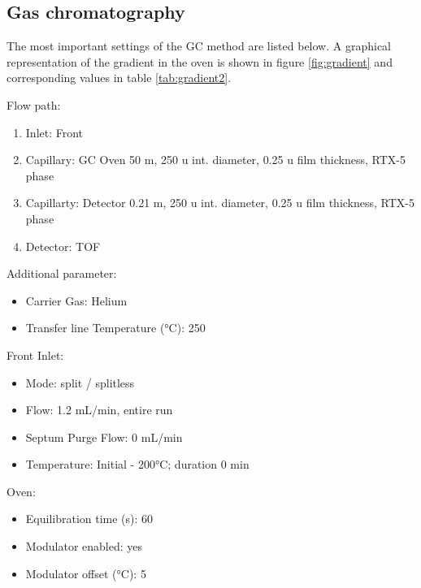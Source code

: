 \documentclass[]{book}
\providecommand{\tightlist}{%
  \setlength{\itemsep}{0pt}\setlength{\parskip}{0pt}}
\theoremstyle{definition}
\theoremstyle{definition}
\theoremstyle{definition}
\theoremstyle{remark}
\begin{document}
\subsection{Gas chromatography}\label{gas-chromatography}

The most important settings of the GC method are listed below. A
graphical representation of the gradient in the oven is shown in figure
\ref{fig:gradient} and corresponding values in table
\ref{tab:gradient2}.

Flow path:

\begin{enumerate}
\def\labelenumi{\arabic{enumi}.}
\tightlist
\item
  Inlet: Front
\item
  Capillary: GC Oven 50 m, 250 u int. diameter, 0.25 u film thickness,
  RTX-5 phase
\item
  Capillarty: Detector 0.21 m, 250 u int. diameter, 0.25 u film
  thickness, RTX-5 phase
\item
  Detector: TOF
\end{enumerate}

Additional parameter:

\begin{itemize}
\tightlist
\item
  Carrier Gas: Helium
\item
  Transfer line Temperature (°C): 250
\end{itemize}

Front Inlet:

\begin{itemize}
\tightlist
\item
  Mode: split / splitless
\item
  Flow: 1.2 mL/min, entire run
\item
  Septum Purge Flow: 0 mL/min
\item
  Temperature: Initial - 200°C; duration 0 min
\end{itemize}

Oven:

\begin{itemize}
\tightlist
\item
  Equilibration time (s): 60
\item
  Modulator enabled: yes
\item
  Modulator offset (°C): 5
\end{itemize}
\end{document}
